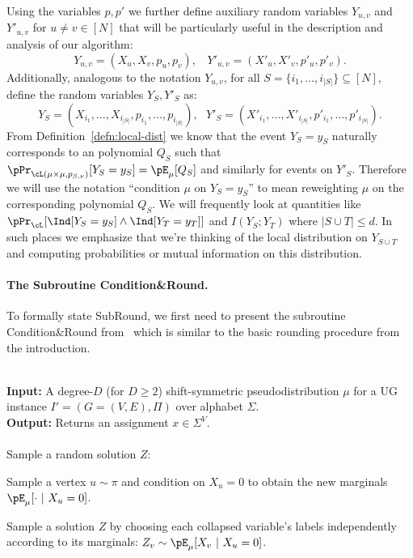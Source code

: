 Using the variables $p,p'$ we further define auxiliary random variables $Y_{u,v}$ and $Y'_{u,v}$ for $u \neq v \in [N]$ that will be particularly useful in the description and analysis of our algorithm: 
\begin{equation}
Y_{u,v} = (X_u,X_v,p_u,p_v), ~~~~ Y'_{u,v} = (X'_u,X'_v,p'_u,p'_v).
\end{equation}
Additionally, analogous to the notation $Y_{u,v}$, for all $S = \{i_1,\ldots,i_{|S|}\} \subseteq [N]$, define the random variables $Y_S, Y'_S$ as: 
\[Y_S = (X_{i_1}, \ldots, X_{i_{|S|}}, p_{i_1}, \ldots, p_{i_{|S|}}), ~~~ Y'_S = (X'_{i_1}, \ldots, X'_{i_{|S|}}, p'_{i_1}, \ldots, p'_{i_{|S|}}).\]
From Definition~\ref{defn:local-dist} we know that the event $Y_S = y_S$ naturally corresponds to an \sos polynomial $Q_S$ such that $\pPr_{{\cL}(\mu \times \mu, p_{\beta,\nu})}[Y_S = y_S] = \pE_{\mu}[Q_S]$ and similarly for events on $Y'_S$. Therefore we will use the notation ``condition $\mu$ on $Y_S = y_S$'' to mean reweighting $\mu$ on the corresponding polynomial $Q_S$. We will frequently look at quantities like $\pPr_{\cL}[\Ind[Y_S = y_S] \wedge \Ind[Y_T = y_T]]$ and $I(Y_S;Y_T)$ where $|S \cup T| \leq d$. In such places we emphasize that we're thinking of the local distribution on $Y_{S \cup T}$ and computing probabilities or mutual information on this distribution.

\skipi
\paragraph{The Subroutine Condition\&Round.}
To formally state SubRound, we first need to present
the subroutine Condition\&Round from~\cite{BBKSS} which is similar to 
the basic rounding procedure from the introduction.
\begin{algorithm-thm}\label{alg:low-ent-restated} ~\\ 
\textbf{Input:} A degree-$D$ (for $D \geq 2$) 
shift-symmetric pseudodistribution
$\mu$ for a UG  instance $I'=(G=(V,E),\Pi)$ over alphabet $\Sigma$.  \\
\textbf{Output:} Returns an assignment $x \in \Sigma^V$. %
\\\\
Sample a random solution $Z$:
\begin{compactenum}
\item Sample a vertex $u \sim \pi$ and condition on $X_{u} = 0$ to obtain the new marginals $\pE_\mu[\cdot ~|~ X_{u} = 0]$.
\item Sample a solution $Z$ by choosing each collapsed variable's labels independently according to its marginals: $Z_v \sim \pE_\mu[X_v ~|~ X_{u} = 0]$.
\end{compactenum}
\end{algorithm-thm}
